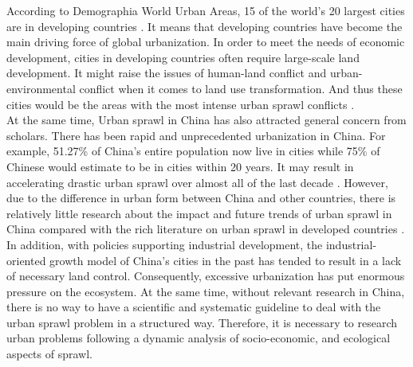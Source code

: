 According to Demographia World Urban Areas, 15 of the world's 20 largest cities are in developing countries \parencite{demographia_world_demographia_2021}. It means that developing countries have become the main driving force of global urbanization. In order to meet the needs of economic development, cities in developing countries often require large-scale land development. It might raise the issues of human-land conflict and urban-environmental conflict when it comes to land use transformation. And thus these cities would be the areas with the most intense urban sprawl conflicts \parencite{yue_measuring_2013}.\\

At the same time, Urban sprawl in China has also attracted general concern from scholars. There has been rapid and unprecedented urbanization in China. For example, 51.27\% of China’s entire population now live in cities while 75\% of Chinese would estimate to be in cities within 20 years. It may result in accelerating drastic urban sprawl over almost all of the last decade \parencite{li_urban_2019}. However, due to the difference in urban form between China and other countries, there is relatively little research about the impact and future trends of urban sprawl in China compared with the rich literature on urban sprawl in developed countries \parencite{wang_dynamics_2020}. In addition, with policies supporting industrial development, the industrial-oriented growth model of China's cities in the past has tended to result in a lack of necessary land control. Consequently, excessive urbanization has put enormous pressure on the ecosystem. At the same time, without relevant research in China, there is no way to have a scientific and systematic guideline to deal with the urban sprawl problem in a structured way. Therefore, it is necessary to research urban problems following a dynamic analysis of socio-economic, and ecological aspects of sprawl.\\


